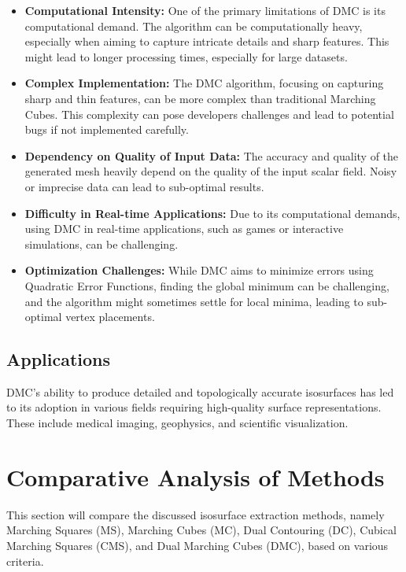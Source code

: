 \begin{itemize}
\item \textbf{Computational Intensity:} One of the primary limitations of DMC is its computational demand. The algorithm can be computationally heavy, especially when aiming to capture intricate details and sharp features. This might lead to longer processing times, especially for large datasets.

\item \textbf{Complex Implementation:} The DMC algorithm, focusing on capturing sharp and thin features, can be more complex than traditional Marching Cubes. This complexity can pose developers challenges and lead to potential bugs if not implemented carefully.

\item \textbf{Dependency on Quality of Input Data:} The accuracy and quality of the generated mesh heavily depend on the quality of the input scalar field. Noisy or imprecise data can lead to sub-optimal results.

\item \textbf{Difficulty in Real-time Applications:} Due to its computational demands, using DMC in real-time applications, such as games or interactive simulations, can be challenging.

\item \textbf{Optimization Challenges:} While DMC aims to minimize errors using Quadratic Error Functions, finding the global minimum can be challenging, and the algorithm might sometimes settle for local minima, leading to sub-optimal vertex placements.
\end{itemize}

\subsection{Applications}

DMC's ability to produce detailed and topologically accurate isosurfaces has led to its adoption in various fields requiring high-quality surface representations. These include medical imaging, geophysics, and scientific visualization.

\section{Comparative Analysis of Methods}

This section will compare the discussed isosurface extraction methods, namely Marching Squares (MS), Marching Cubes (MC), Dual Contouring (DC), Cubical Marching Squares (CMS), and Dual Marching Cubes (DMC), based on various criteria.

